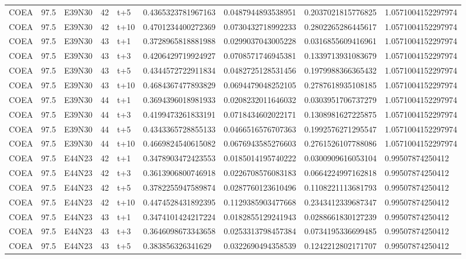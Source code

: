 \begin{landscape}
\begin{longtable}{lllllllll}
COEA & 97.5 & E39N30 & 42 & t+5 & 0.4365323781967163 & 0.0487944893538951 & 0.2037021815776825 & 1.0571004152297974 \\
COEA & 97.5 & E39N30 & 42 & t+10 & 0.4701234400272369 & 0.0730432718992233 & 0.2802265286445617 & 1.0571004152297974 \\
COEA & 97.5 & E39N30 & 43 & t+1 & 0.3728965818881988 & 0.0299037043005228 & 0.0316855609416961 & 1.0571004152297974 \\
COEA & 97.5 & E39N30 & 43 & t+3 & 0.4206429719924927 & 0.0708571746945381 & 0.1339713931083679 & 1.0571004152297974 \\
COEA & 97.5 & E39N30 & 43 & t+5 & 0.4344572722911834 & 0.0482725128531456 & 0.1979988366365432 & 1.0571004152297974 \\
COEA & 97.5 & E39N30 & 43 & t+10 & 0.4684367477893829 & 0.0694479048252105 & 0.2787618935108185 & 1.0571004152297974 \\
COEA & 97.5 & E39N30 & 44 & t+1 & 0.3694396018981933 & 0.0208232011646032 & 0.0303951706737279 & 1.0571004152297974 \\
COEA & 97.5 & E39N30 & 44 & t+3 & 0.4199473261833191 & 0.0718434602022171 & 0.1308981627225875 & 1.0571004152297974 \\
COEA & 97.5 & E39N30 & 44 & t+5 & 0.4343365728855133 & 0.0466516576707363 & 0.1992576271295547 & 1.0571004152297974 \\
COEA & 97.5 & E39N30 & 44 & t+10 & 0.4669824540615082 & 0.0676943585276603 & 0.2761526107788086 & 1.0571004152297974 \\
COEA & 97.5 & E44N23 & 42 & t+1 & 0.3478903472423553 & 0.0185014195740222 & 0.0300909616053104 & 0.99507874250412 \\
COEA & 97.5 & E44N23 & 42 & t+3 & 0.3613906800746918 & 0.0226708576083183 & 0.0664224997162818 & 0.99507874250412 \\
COEA & 97.5 & E44N23 & 42 & t+5 & 0.3782255947589874 & 0.0287760123610496 & 0.1108221113681793 & 0.99507874250412 \\
COEA & 97.5 & E44N23 & 42 & t+10 & 0.4474528431892395 & 0.1129385903477668 & 0.2343412339687347 & 0.99507874250412 \\
COEA & 97.5 & E44N23 & 43 & t+1 & 0.3474101424217224 & 0.0182855129241943 & 0.0288661830127239 & 0.99507874250412 \\
COEA & 97.5 & E44N23 & 43 & t+3 & 0.3646098673343658 & 0.0253313798457384 & 0.0734195336699485 & 0.99507874250412 \\
COEA & 97.5 & E44N23 & 43 & t+5 & 0.383856326341629 & 0.0322690494358539 & 0.1242212802171707 & 0.99507874250412 \\

\end{longtable}
\end{landscape}
